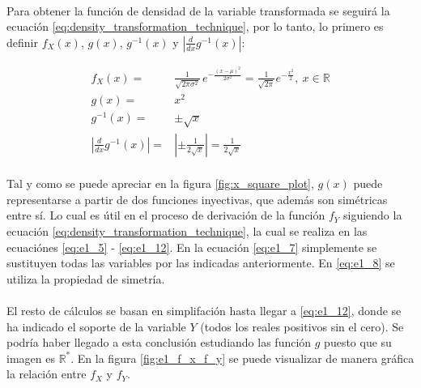 \documentclass{article}
\begin{document}
    \paragraph{}
    Para obtener la función de densidad de la variable transformada se seguirá la ecuación \eqref{eq:density_transformation_technique}, por lo tanto, lo primero es definir $f_X(x)$, $g(x)$, $g^{-1}(x)$ y $\left| \frac{d}{dx} g^{-1} (x) \right|$:

    \begin{align}
    \label{eq:e1_1}
      f_X(x) =& {\displaystyle {\frac {1}{\sqrt {2\pi \sigma ^{2}}}}\,e^{-{\frac {(x-\mu )^{2}}{2\sigma ^{2}}}}} = \frac{1}{\sqrt{2\pi} } e^{-\frac{x^2}{2}}, \ x \in \mathbb{R} \\
    \label{eq:e1_2}
      g(x) =& x^2 \\
    \label{eq:e1_3}
      g^{-1}(x) =& \pm \sqrt{x} \\
    \label{eq:e1_4}
      \left| \frac{d}{dx} g^{-1} (x) \right| =& \left| \pm \frac{1}{2\sqrt{x}}  \right| = \frac{1}{2\sqrt{x}}
    \end{align}

    \paragraph{}
    Tal y como se puede apreciar en la figura \ref{fig:x_square_plot}, $g(x)$ puede representarse a partir de dos funciones inyectivas, que además son simétricas entre sí. Lo cual es útil en el proceso de derivación de la función $f_Y$ siguiendo la ecuación \eqref{eq:density_transformation_technique}, la cual se realiza en las ecuaciónes \eqref{eq:e1_5} - \eqref{eq:e1_12}. En la ecuación \eqref{eq:e1_7} simplemente se sustituyen todas las variables por las indicadas anteriormente. En \eqref{eq:e1_8} se utiliza la propiedad de simetría.

    \paragraph{}
    El resto de cálculos se basan en simplifación hasta llegar a \eqref{eq:e1_12}, donde se ha indicado el soporte de la variable $Y$ (todos los reales positivos sin el cero). Se podría haber llegado a esta conclusión estudiando las función $g$ puesto que su imagen es  $\mathbb{R^*}$. En la figura \ref{fig:e1_f_x_f_y} se puede visualizar de manera gráfica la relación entre $f_X$ y $f_Y$.
\end{document}
